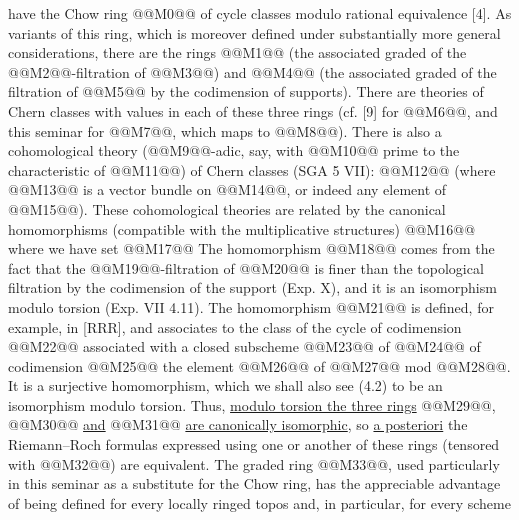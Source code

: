 have the Chow ring @@M0@@ of cycle classes modulo rational equivalence [4]. As variants of this ring, which is moreover defined under substantially more general considerations, there are the rings @@M1@@ (the associated graded of the @@M2@@-filtration of @@M3@@) and @@M4@@ (the associated graded of the filtration of @@M5@@ by the codimension of supports). There are theories of Chern classes with values in each of these three rings (cf. [9] for @@M6@@, and this seminar for @@M7@@, which maps to @@M8@@). There is also a cohomological theory (@@M9@@-adic, say, with @@M10@@ prime to the characteristic of @@M11@@) of Chern classes (SGA 5 VII):
@@M12@@
(where @@M13@@ is a vector bundle on @@M14@@, or indeed any element of @@M15@@). These cohomological theories are related by the canonical homomorphisms (compatible with the multiplicative structures)
@@M16@@
where we have set
@@M17@@
The homomorphism @@M18@@ comes from the fact that the @@M19@@-filtration of @@M20@@ is finer than the topological filtration by the codimension of the support (Exp. X), and it is an isomorphism modulo torsion (Exp. VII 4.11). The homomorphism @@M21@@ is defined, for example, in [RRR], and associates to the class of the cycle of codimension @@M22@@ associated with a closed subscheme @@M23@@ of @@M24@@ of codimension @@M25@@ the element @@M26@@ of @@M27@@ mod @@M28@@. It is a surjective homomorphism, which we shall also see (4.2) to be an isomorphism modulo torsion. Thus, \uline{modulo torsion the three rings} @@M29@@, @@M30@@ \uline{and} @@M31@@ \uline{are canonically isomorphic}, so \uline{a posteriori} the Riemann--Roch formulas expressed using one or another of these rings (tensored with @@M32@@) are equivalent. The graded ring @@M33@@, used particularly in this seminar as a substitute for the Chow ring, has the appreciable advantage of being defined for every locally ringed topos and, in particular, for every scheme

